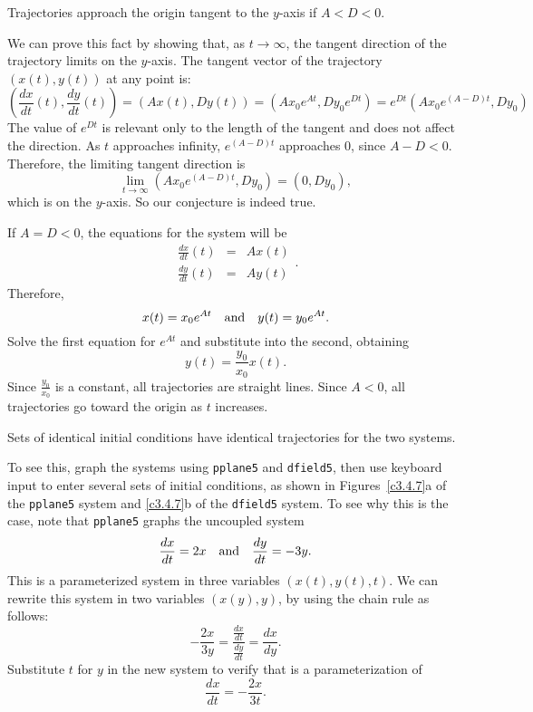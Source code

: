 \documentclass{ximera}
\begin{document}
\ans Trajectories approach the origin tangent to the $y$-axis if
$A < D < 0$. 

\soln We can prove this fact by showing that, as $t \rightarrow \infty$,
the tangent direction of the trajectory limits on the $y$-axis.  The
tangent vector of the trajectory $(x(t),y(t))$ at any point is:
\[ \left(\frac{dx}{dt}(t), \frac{dy}{dt}(t)\right) = \left(Ax(t),
Dy(t)\right) = \left(Ax_0e^{At}, Dy_0e^{Dt}\right) =
e^{Dt}\left(Ax_0e^{(A - D)t}, Dy_0\right) \]
The value of $e^{Dt}$ is relevant only to the length of the
tangent and does not affect the direction.  As $t$ approaches
infinity, $e^{(A - D)t}$ approaches $0$, since $A - D < 0$.
Therefore, the limiting tangent direction is
\[ \lim_{t \rightarrow \infty} \left(Ax_0e^{(A - D)t}, Dy_0\right)
= (0, Dy_0), \]
which is on the $y$-axis.  So our conjecture is indeed true.

If $A = D < 0$, the equations for the system will be
\[ \begin{array}{rcl}
\frac{dx}{dt}(t) & = & Ax(t) \\
\frac{dy}{dt}(t) & = & Ay(t)\end{array}. \]
Therefore,
\[ x(t) = x_0e^{At} \quad\mbox{and}\quad y(t) = y_0e^{At}. \]
Solve the first equation for $e^{At}$ and substitute into the
second, obtaining \[ y(t) = \frac{y_0}{x_0}x(t). \]
Since $\frac{y_0}{x_0}$ is a constant, all trajectories are
straight lines.  Since $A < 0$, all trajectories go toward the
origin as $t$ increases.

\ans Sets of identical initial conditions have identical trajectories
for the two systems. 

\soln To see this, graph the systems using {\tt pplane5} and
{\tt dfield5}, then use keyboard input to enter several sets of initial
conditions, as shown in Figures~\ref{c3.4.7}a of the {\tt pplane5} system
and \ref{c3.4.7}b of the {\tt dfield5} system.  To see why this is the case,
note that {\tt pplane5} graphs the uncoupled system
\begin{equation} \label{eq:3.4.7}
\frac{dx}{dt} = 2x \quad\mbox{and}\quad \frac{dy}{dt} = -3y.
\end{equation}
This is a parameterized system in three variables $(x(t),y(t),t)$.
We can rewrite this system in two variables $(x(y),y)$, by using the
chain rule as follows:
\[ -\frac{2x}{3y} = \frac{\frac{dx}{dt}}{\frac{dy}{dt}} = \frac{dx}{dy}. \]
Substitute $t$ for $y$ in the new system to verify that 
is a parameterization of
\[ \frac{dx}{dt} = -\frac{2x}{3t}. \]
\end{document}
